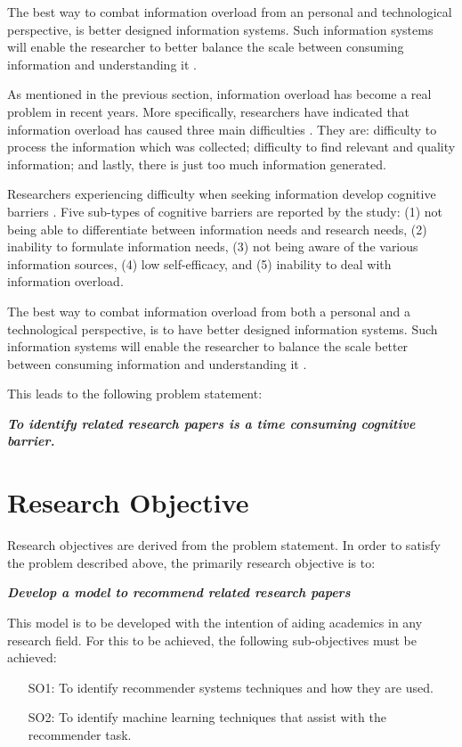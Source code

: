 The best way to combat information overload from an personal and technological perspective, is better designed information systems. Such information systems will enable the researcher to better balance the scale between consuming information and understanding it \cite{bawden2020information}.



As mentioned in the previous section, information overload has become a real problem in recent years. More specifically, researchers have indicated that information overload has caused three main difficulties \cite{al2021exploring}. They are: difficulty to process the information which was collected; difficulty to find relevant and quality information; and lastly, there is just too much information generated.

Researchers experiencing difficulty when seeking information develop cognitive barriers \cite{savolainen2015cognitive}. Five sub-types of cognitive barriers are reported by the study: (1) not being able to differentiate between information needs and research needs, (2) inability to formulate information needs, (3) not being aware of the various information sources, (4) low self-efficacy, and (5) inability to deal with information overload.

The best way to combat information overload from both a personal and a technological perspective, is to have better designed information systems. Such information systems will enable the researcher to balance the scale better between consuming information and understanding it \cite{bawden2020information}.

This leads to the following problem statement:

\textbf{\textit{To identify related research papers is a time consuming cognitive barrier.}}

\section{Research Objective} \label{ssec: Chapter 1}

Research objectives are derived from the problem statement. In order to satisfy the problem described above, the primarily research objective is to:

\textbf{\textit{Develop a model to recommend related research papers}}

This model is to be developed with the intention of aiding academics in any research field. For this to be achieved, the following sub-objectives must be achieved:
\begin{itemize}
  \item[SO1:] To identify recommender systems techniques and how they are used.
  \item[SO2:] To identify machine learning techniques that assist with the recommender task.
\end{itemize}

